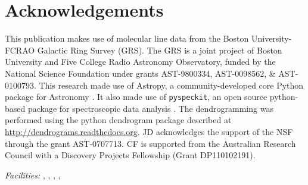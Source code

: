 \section{Acknowledgements}
This publication makes use of molecular line data from the Boston
University-FCRAO Galactic Ring Survey (GRS). The GRS is a joint project of
Boston University and Five College Radio Astronomy Observatory, funded by the
National Science Foundation under grants AST-9800334, AST-0098562, \&
AST-0100793.
This research made use of Astropy, a community-developed core Python package
for Astronomy \citep{Astropy2013a}.  It also made use of \texttt{pyspeckit}, an
open source python-based package for spectroscopic data analysis
\citep[\url{http://pyspeckit.bitbucket.org}][]{Ginsburg2011c}.
The dendrogramming was performed using the python dendrogram package described at
\url{http://dendrograms.readthedocs.org}.
JD acknowledges the support of the NSF through the grant AST-0707713.
CF is supported from the Australian Research Council with a Discovery Projects Fellowship (Grant DP110102191).



{\it Facilities:} , , ,
, 



% 
% 

